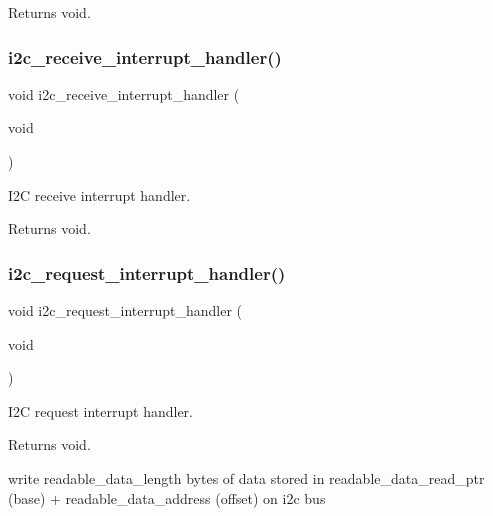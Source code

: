 \begin{DoxyReturn}{Returns}
void. 
\end{DoxyReturn}
\mbox{\label{i2c-th_8h_a7f81fcf39717baf18f2e7c2eee2051ae}} 
\subsubsection{\texorpdfstring{i2c\+\_\+receive\+\_\+interrupt\+\_\+handler()}{i2c\_receive\_interrupt\_handler()}}
{\footnotesize\ttfamily void i2c\+\_\+receive\+\_\+interrupt\+\_\+handler (\begin{DoxyParamCaption}\item[{void}]{ }\end{DoxyParamCaption})}



I2C receive interrupt handler. 

\begin{DoxyReturn}{Returns}
void. 
\end{DoxyReturn}
\mbox{\label{i2c-th_8h_ac1da31566bf05976ecb87372278a1ea8}} 
\subsubsection{\texorpdfstring{i2c\+\_\+request\+\_\+interrupt\+\_\+handler()}{i2c\_request\_interrupt\_handler()}}
{\footnotesize\ttfamily void i2c\+\_\+request\+\_\+interrupt\+\_\+handler (\begin{DoxyParamCaption}\item[{void}]{ }\end{DoxyParamCaption})}



I2C request interrupt handler. 

\begin{DoxyReturn}{Returns}
void. 
\end{DoxyReturn}
write readable\+\_\+data\+\_\+length bytes of data stored in readable\+\_\+data\+\_\+read\+\_\+ptr (base) + readable\+\_\+data\+\_\+address (offset) on i2c bus \mbox{\label{i2c-th_8h_ad438327c9cf783bd9c519ce8b8ef3bfa}} 
